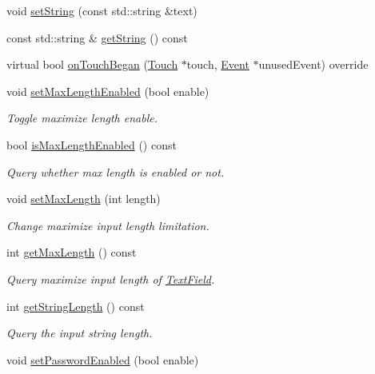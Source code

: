 \begin{DoxyCompactItemize}
\item 
void \hyperlink{classui_1_1TextField_a7bd0a4832cf52651f5fccfb15d3c97c4}{set\+String} (const std\+::string \&text)
\item 
const std\+::string \& \hyperlink{classui_1_1TextField_aba3ac805a106d31c280b864f970eb2e1}{get\+String} () const
\item 
virtual bool \hyperlink{classui_1_1TextField_a4716933981fd6f75e03baed7ec565587}{on\+Touch\+Began} (\hyperlink{classTouch}{Touch} $\ast$touch, \hyperlink{classEvent}{Event} $\ast$unused\+Event) override
\item 
void \hyperlink{classui_1_1TextField_a519ce96bf6df5bf88f1952ddf0acfa7a}{set\+Max\+Length\+Enabled} (bool enable)
\begin{DoxyCompactList}\small\item\em Toggle maximize length enable. \end{DoxyCompactList}\item 
bool \hyperlink{classui_1_1TextField_af1c9a7bd43a96e69cda3a2ab4e93758b}{is\+Max\+Length\+Enabled} () const
\begin{DoxyCompactList}\small\item\em Query whether max length is enabled or not. \end{DoxyCompactList}\item 
void \hyperlink{classui_1_1TextField_ad952090257800bf298acb875d4462c0a}{set\+Max\+Length} (int length)
\begin{DoxyCompactList}\small\item\em Change maximize input length limitation. \end{DoxyCompactList}\item 
int \hyperlink{classui_1_1TextField_a21ae7052464727df77737475ebe4cf34}{get\+Max\+Length} () const
\begin{DoxyCompactList}\small\item\em Query maximize input length of \hyperlink{classui_1_1TextField}{Text\+Field}. \end{DoxyCompactList}\item 
int \hyperlink{classui_1_1TextField_a5c3bc7fe189d790d4e209527dbeba2ab}{get\+String\+Length} () const
\begin{DoxyCompactList}\small\item\em Query the input string length. \end{DoxyCompactList}\item 
void \hyperlink{classui_1_1TextField_a9d20b87cd9307d0e5bcf5fa5c86d1c19}{set\+Password\+Enabled} (bool enable)

\end{DoxyCompactItemize}
